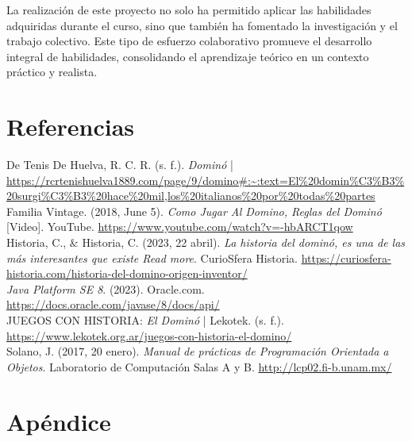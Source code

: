\documentclass[12pt]{article}
\begin{document}
  La realización de este proyecto no solo ha permitido aplicar las habilidades adquiridas durante el curso, sino que también ha fomentado la investigación y el trabajo colectivo. Este tipo de esfuerzo colaborativo promueve el desarrollo integral de habilidades, consolidando el aprendizaje teórico en un contexto práctico y realista.

  \section{Referencias}
  De Tenis De Huelva, R. C. R. (s. f.). \textit{Dominó} | \url{https://rcrtenishuelva1889.com/page/9/domino#:~:text=El%20domin%C3%B3%20surgi%C3%B3%20hace%20mil,los%20italianos%20por%20todas%20partes} \\

  Familia Vintage. (2018, June 5). \textit{Como Jugar Al Domino, Reglas del Dominó} [Video]. YouTube. \url{https://www.youtube.com/watch?v=-hbARCT1qow} \\

  Historia, C., $\&$ Historia, C. (2023, 22 abril). \textit{La historia del dominó, es una de las más interesantes que existe Read more}. CurioSfera Historia. \url{https://curiosfera-historia.com/historia-del-domino-origen-inventor/} \\

  \textit{Java Platform SE 8}. (2023). Oracle.com. \url{https://docs.oracle.com/javase/8/docs/api/} \\

  JUEGOS CON HISTORIA: \textit{El Dominó} | Lekotek. (s. f.). \url{https://www.lekotek.org.ar/juegos-con-historia-el-domino/} \\

  Solano, J. (2017, 20 enero). \textit{Manual de prácticas de Programación Orientada a Objetos}. Laboratorio de Computación Salas A y B. \url{http://lcp02.fi-b.unam.mx/} 

  \newpage
  \section{Apéndice}
\end{document}
